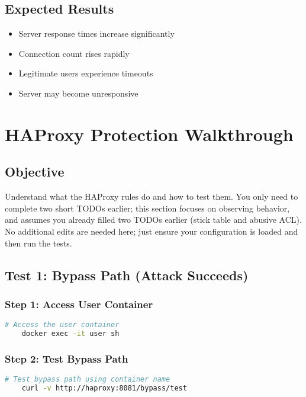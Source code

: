 \documentclass[12pt]{article}
\begin{document}
    \subsection{Expected Results}
    \begin{itemize}
        \item Server response times increase significantly
        \item Connection count rises rapidly
        \item Legitimate users experience timeouts
        \item Server may become unresponsive
    \end{itemize}

    \section{HAProxy Protection Walkthrough}

    \subsection{Objective}
    Understand what the HAProxy rules do and how to test them. You only need to complete two short TODOs earlier; this section focuses on observing behavior, and assumes you already filled two TODOs earlier (stick table and abusive ACL). No additional edits are needed here; just ensure your configuration is loaded and then run the tests.

    


    \subsection{Test 1: Bypass Path (Attack Succeeds)}

    \subsubsection{Step 1: Access User Container}
    \begin{lstlisting}[language=bash]
    # Access the user container
    docker exec -it user sh
    \end{lstlisting}

    \subsubsection{Step 2: Test Bypass Path}
    \begin{lstlisting}[language=bash]
    # Test bypass path using container name
    curl -v http://haproxy:8081/bypass/test
    \end{lstlisting}
\end{document}
